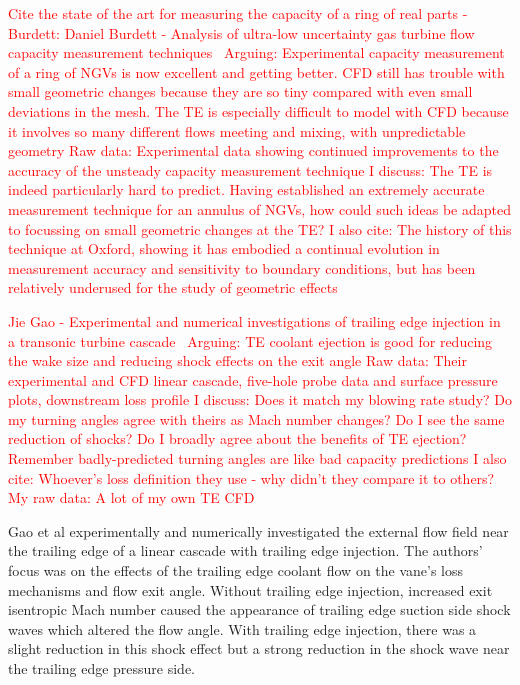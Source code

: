\documentclass[a4paper, 11pt, twoside]{report}
\begin{document}
\textcolor{red}{Cite the state of the art for measuring the capacity of a ring of real parts - Burdett:}
	\textcolor{red}{Daniel Burdett - Analysis of ultra-low uncertainty gas turbine flow capacity measurement techniques~\cite{burdett_capacity_measurement}}
		\textcolor{red}{Arguing: Experimental capacity measurement of a ring of NGVs is now excellent and getting better. CFD still has trouble with small geometric changes because they are so tiny compared with even small deviations in the mesh. The TE is especially difficult to model with CFD because it involves so many different flows meeting and mixing, with unpredictable geometry}
		\textcolor{red}{Raw data: Experimental data showing continued improvements to the accuracy of the unsteady capacity measurement technique}
		\textcolor{red}{I discuss: The TE is indeed particularly hard to predict. Having established an extremely accurate measurement technique for an annulus of NGVs, how could such ideas be adapted to focussing on small geometric changes at the TE?}
		\textcolor{red}{I also cite: The history of this technique at Oxford, showing it has embodied a continual evolution in measurement accuracy and sensitivity to boundary conditions, but has been relatively underused for the study of geometric effects}
		
\textcolor{red}{Jie Gao - Experimental and numerical investigations of trailing edge injection in a transonic turbine cascade~\cite{gao_te}}
	\textcolor{red}{Arguing: TE coolant ejection is good for reducing the wake size and reducing shock effects on the exit angle}
	\textcolor{red}{Raw data: Their experimental and CFD linear cascade, five-hole probe data and surface pressure plots, downstream loss profile}
	\textcolor{red}{I discuss: Does it match my blowing rate study? Do my turning angles agree with theirs as Mach number changes? Do I see the same reduction of shocks? Do I broadly agree about the benefits of TE ejection? Remember badly-predicted turning angles are like bad capacity predictions}
	\textcolor{red}{I also cite: Whoever's loss definition they use - why didn't they compare it to others?}
	\textcolor{red}{My raw data: A lot of my own TE CFD}
	
Gao et al experimentally and numerically investigated the external flow field near the trailing edge of a linear cascade with trailing edge injection. The authors' focus was on the effects of the trailing edge coolant flow on the vane's loss mechanisms and flow exit angle. Without trailing edge injection, increased exit isentropic Mach number caused the appearance of trailing edge suction side shock waves which altered the flow angle. With trailing edge injection, there was a slight reduction in this shock effect but a strong reduction in the shock wave near the trailing edge pressure side.
		
\end{document}
